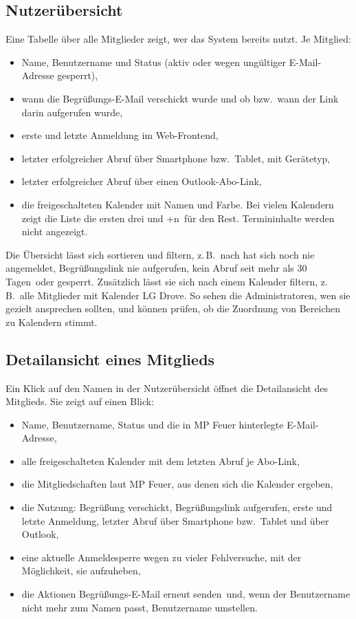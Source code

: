 \documentclass[a4paper,fontsize=10pt]{scrartcl}
\begin{document}
\subsection*{Nutzerübersicht}

Eine Tabelle über alle Mitglieder zeigt, wer das System bereits nutzt. Je
Mitglied:

\begin{itemize}
  \item Name, Benutzername und Status (aktiv oder wegen ungültiger
        E-Mail-Adresse gesperrt),
  \item wann die Begrüßungs-E-Mail verschickt wurde und ob bzw.\ wann der
        Link darin aufgerufen wurde,
  \item erste und letzte Anmeldung im Web-Frontend,
  \item letzter erfolgreicher Abruf über Smartphone bzw.\ Tablet, mit
        Gerätetyp,
  \item letzter erfolgreicher Abruf über einen Outlook-Abo-Link,
  \item die freigeschalteten Kalender mit Namen und Farbe. Bei vielen
        Kalendern zeigt die Liste die ersten drei und \glqq +n\grqq\ für den
        Rest. Termininhalte werden nicht angezeigt.
\end{itemize}

Die Übersicht lässt sich sortieren und filtern, z.\,B.\ nach
\glqq hat sich noch nie angemeldet\grqq, \glqq Begrüßungslink nie
aufgerufen\grqq, \glqq kein Abruf seit mehr als 30 Tagen\grqq\ oder
\glqq gesperrt\grqq. Zusätzlich lässt sie sich nach einem Kalender filtern,
z.\,B.\ \glqq alle Mitglieder mit Kalender LG Drove\grqq. So sehen die
Administratoren, wen sie gezielt ansprechen sollten, und können prüfen, ob die
Zuordnung von Bereichen zu Kalendern stimmt.

\subsection*{Detailansicht eines Mitglieds}

Ein Klick auf den Namen in der Nutzerübersicht öffnet die Detailansicht des
Mitglieds. Sie zeigt auf einen Blick:

\begin{itemize}
  \item Name, Benutzername, Status und die in MP Feuer hinterlegte
        E-Mail-Adresse,
  \item alle freigeschalteten Kalender mit dem letzten Abruf je Abo-Link,
  \item die Mitgliedschaften laut MP Feuer, aus denen sich die Kalender
        ergeben,
  \item die Nutzung: Begrüßung verschickt, Begrüßungslink aufgerufen,
        erste und letzte Anmeldung, letzter Abruf über Smartphone bzw.\
        Tablet und über Outlook,
  \item eine aktuelle Anmeldesperre wegen zu vieler Fehlversuche, mit der
        Möglichkeit, sie aufzuheben,
  \item die Aktionen \glqq Begrüßungs-E-Mail erneut senden\grqq\ und, wenn
        der Benutzername nicht mehr zum Namen passt, \glqq Benutzername
        umstellen\grqq.
\end{itemize}
\end{document}
